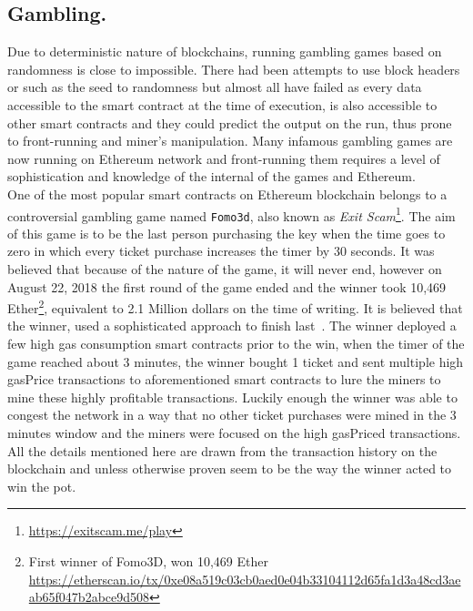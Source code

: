 
\subsection{Gambling.} 
Due to deterministic nature of blockchains, running gambling games based on randomness is close to impossible. There had been attempts to use block headers or such as the seed to randomness but almost all have failed as every data accessible to the smart contract at the time of execution, is also accessible to other smart contracts and they could predict the output on the run, thus prone to front-running and miner's manipulation. Many infamous gambling games are now running on Ethereum network and front-running them requires a level of sophistication and knowledge of the internal of the games and Ethereum.\\
One of the most popular smart contracts on Ethereum blockchain belongs to a controversial gambling game named \texttt{Fomo3d}, also known as \textit{Exit Scam}\footnote{\url{https://exitscam.me/play}}. The aim of this game is to be the last person purchasing the key when the time goes to zero in which every ticket purchase increases the timer by 30 seconds. It was believed that because of the nature of the game, it will never end, however on August 22, 2018 the first round of the game ended and the winner took 10,469 Ether\footnote{First winner of Fomo3D, won 10,469 Ether \url{ https://etherscan.io/tx/0xe08a519c03cb0aed0e04b33104112d65fa1d3a48cd3aeab65f047b2abce9d508}}, equivalent to 2.1 Million dollars on the time of writing. 
It is believed that the winner, used a sophisticated approach to finish last~\cite{fomo3dhacker}. The winner deployed a few high gas consumption smart contracts prior to the win, when the timer of the game reached about 3 minutes, the winner bought 1 ticket and sent multiple high gasPrice transactions to aforementioned smart contracts to lure the miners to mine these highly profitable transactions. Luckily enough the winner was able to congest the network in a way that no other ticket purchases were mined in the 3 minutes window and the miners were focused on the high gasPriced transactions. All the details mentioned here are drawn from the transaction history on the blockchain and unless otherwise proven seem to be the way the winner acted to win the pot. 



